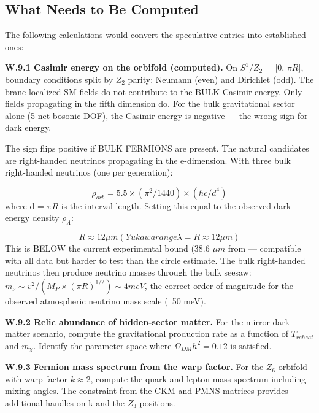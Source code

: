\documentclass[aps,prd,preprint,superscriptaddress,longbibliography,floatfix]{revtex4-2}
\theoremstyle{remark}
\begin{document}
\subsection{What Needs to Be Computed}

The following calculations would convert the speculative entries into established ones:

\textbf{W.9.1 Casimir energy on the orbifold (computed).} On $S^{1}/Z_{2}$ = [0, $\pi R$], boundary conditions split by $Z_{2}$ parity: Neumann (even) and Dirichlet (odd). The brane-localized SM fields do not contribute to the BULK Casimir energy. Only fields propagating in the fifth dimension do. For the bulk gravitational sector alone (5 net bosonic DOF), the Casimir energy is negative --- the wrong sign for dark energy.

The sign flips positive if BULK FERMIONS are present. The natural candidates are right-handed neutrinos propagating in the e-dimension. With three bulk right-handed neutrinos (one per generation):


\begin{equation}
    \rho_{orb} = 5.5 \times (\pi^{2}/1440) \times (\hbar c/d^{4})
\end{equation}
where d = $\pi R$ is the interval length. Setting this equal to the observed dark energy density $\rho_\Lambda$:


\begin{equation}
    R \approx 12 \mu m   (Yukawa range \lambda = R \approx 12 \mu m)
\end{equation}
This is BELOW the current experimental bound (38.6 $\mu m$ from \cite{Leeetal2020} --- compatible with all data but harder to test than the circle estimate. The bulk right-handed neutrinos then produce neutrino masses through the bulk seesaw: $m_\nu \sim  v^{2}/(M_P \times (\pi R)^{1/2}) \sim  4 meV$, the correct order of magnitude for the observed atmospheric neutrino mass scale (~50 meV).

\textbf{W.9.2 Relic abundance of hidden-sector matter.} For the mirror dark matter scenario, compute the gravitational production rate as a function of $T_{reheat}$ and $m_\chi$. Identify the parameter space where $\Omega_{DM} h^{2} = 0.12$ is satisfied.

\textbf{W.9.3 Fermion mass spectrum from the warp factor.} For the $Z_{6}$ orbifold with warp factor $k \approx 2$, compute the quark and lepton mass spectrum including mixing angles. The constraint from the CKM and PMNS matrices provides additional handles on k and the $Z_{3}$ positions.
\end{document}
